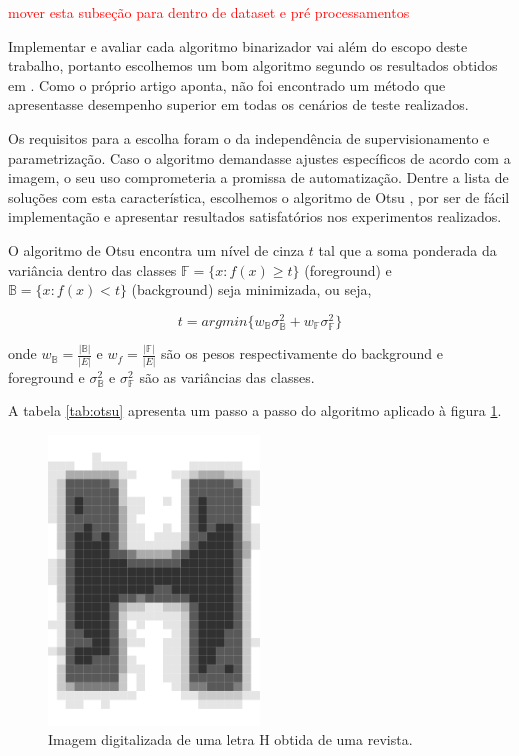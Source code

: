 \documentclass[a4paper,11pt]{article}
\newcommand{\TODO}[1]{\textcolor{red}{#1}}
\begin{document}
    \TODO{mover esta subseção para dentro de dataset e pré processamentos}

    Implementar e avaliar cada algoritmo binarizador vai além do escopo deste trabalho, portanto escolhemos um bom algoritmo segundo os resultados obtidos em \cite{citeulike:890354}. Como o próprio artigo aponta, não foi encontrado um método que apresentasse desempenho superior em todas os cenários de teste realizados.

    Os requisitos para a escolha foram o da independência de supervisionamento e parametrização. Caso o algoritmo demandasse ajustes específicos de acordo com a imagem, o seu uso comprometeria a promissa de automatização. Dentre a lista de soluções com esta característica, escolhemos o algoritmo de Otsu \cite{1979:ots}, por ser de fácil implementação e apresentar resultados satisfatórios nos experimentos realizados.

    O algoritmo de Otsu encontra um nível de cinza $t$ tal que a soma ponderada da variância dentro das classes $\mathbb{F} = \{ x \colon f(x) \geq t \}$ (foreground) e $\mathbb{B} = \{ x \colon f(x) < t \}$ (background) seja minimizada, ou seja,

    \begin{equation}
      t = argmin \{ w_\mathbb{B} \sigma^{2}_{\mathbb{B}} + w_\mathbb{F} \sigma^{2}_{\mathbb{F}} \}
    \end{equation}

    onde $w_\mathbb{B} = \frac{|\mathbb{B}|}{|E|}$ e $w_f = \frac{|\mathbb{F}|}{|E|}$ são os pesos respectivamente do background e foreground e $\sigma^{2}_{\mathbb{B}}$ e $\sigma^{2}_{\mathbb{F}}$ são as variâncias das classes.

    A tabela \ref{tab:otsu} apresenta um passo a passo do algoritmo aplicado à figura \ref{fig:letrah}.

    \begin{figure}[htb]
      \begin{center}
        \includegraphics[width=0.5\textwidth]{assets/binarization/h_3grayscale_big.png}
        \end{center}
      \caption{Imagem digitalizada de uma letra H obtida de uma revista.}
      \label{fig:letrah}
    \end{figure}
\end{document}
